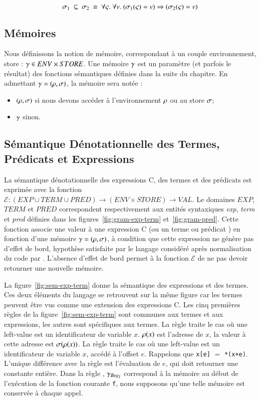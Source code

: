 \[
\sigma_1~\subseteq~\sigma_2~\equiv~
\forall \varsigma.~\forall v.
~(\sigma_1(\varsigma)=v) \Rightarrow (\sigma_2(\varsigma)=v)
\]


\subsection{Mémoires}


Nous définissons la notion de mémoire, correspondant à un couple environnement,
store : $\gamma \in ENV \times STORE$.
Une mémoire $\gamma$ est un paramètre (et parfois le résultat) des fonctions
sémantiques définies dans la suite du chapitre.
En admettant $\gamma = (\rho, \sigma)$, la mémoire sera notée :
\begin{itemize}
\item $(\rho, \sigma)$ si nous devons accéder à l'environnement $\rho$ ou au
  store $\sigma$;
\item $\gamma$ sinon.
\end{itemize}


\subsection{Sémantique Dénotationnelle des Termes, Prédicats et Expressions}



La sémantique dénotationnelle des expressions C, des termes et des prédicats
\eacsl est exprimée avec la fonction
$\mathcal{E} : (EXP \cup TERM \cup PRED) \rightarrow (ENV \times STORE) \rightarrow VAL$.
Le domaines $EXP$, $TERM$ et $PRED$ correspondent respectivement aux entités
syntaxiques \textit{exp}, \textit{term} et \textit{pred} définies dans les
figures~\ref{fig:gram-exp-term} et~\ref{fig:gram-pred}.
Cette fonction associe une valeur à une expression C (ou un terme ou prédicat
\eacsl) en fonction d'une mémoire $\gamma = (\rho, \sigma)$, à condition que cette
expression ne génère pas d'effet de bord, hypothèse satisfaite par le langage
considéré après normalisation du code par \framac.
L'absence d'effet de bord permet à la fonction $\mathcal{E}$ de ne pas devoir
retourner une nouvelle mémoire.

La figure~\ref{fig:sem-exp-term} donne la sémantique des expressions et des
termes.
Ces deux éléments du langage se retrouvent sur la même figure car les termes
peuvent être vus comme une extension des expressions C.
Les cinq premières règles de la figure~\ref{fig:sem-exp-term} sont communes aux
termes et aux expressions, les autres sont spécifiques aux termes.
La règle  traite le cas où une left-value est un identificateur
de variable $x$.
$\rho(x)$ est l'adresse de $x$, la valeur à cette adresse est $\sigma(\rho(x))$.
La règle  traite le cas où une left-value est un identificateur
de variable $x$, accédé à l'offset $e$.
Rappelons que \lstinline'x[e]' $=$ \lstinline'*(x+e)'.
L'unique différence avec la règle  est l'évaluation de $e$, qui
doit retourner une constante entière.
Dans la règle , $\gamma_{Beg_{\mathtt{f}}}$ correspond à la mémoire au
début de l'exécution de la fonction courante \lstinline'f', nous supposons
qu'une telle mémoire est conservée à chaque appel.

